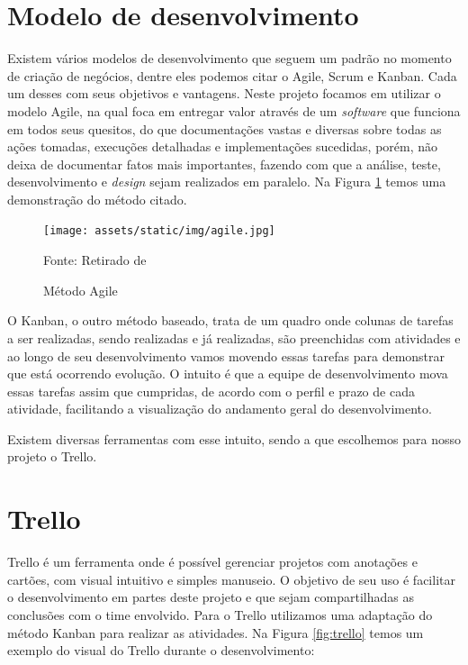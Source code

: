 \documentclass[../../layout.tex]{subfiles}
\begin{document}
\section{Modelo de desenvolvimento}
\hspace*{3em}Existem vários modelos de desenvolvimento que seguem um padrão no momento de criação de negócios, dentre eles podemos citar o Agile, Scrum e Kanban. Cada um desses com seus objetivos e vantagens. Neste projeto focamos em utilizar o modelo Agile, na qual foca em entregar valor através de um \emph{software} que funciona em todos seus quesitos, do que documentações vastas e diversas sobre todas as ações tomadas, execuções detalhadas e implementações sucedidas, porém, não deixa de documentar fatos mais importantes, fazendo com que a análise, teste, desenvolvimento e \emph{design} sejam realizados em paralelo. Na Figura \ref{fig:agile} temos uma demonstração do método citado.

\begin{figure}[H]
\centering
\caption{Método Agile}
\texttt{[image: assets/static/img/agile.jpg]}
\label{fig:agile}

\begin{minipage}{0.5\textwidth}
\raggedright \footnotesize Fonte: Retirado de 
\end{minipage}
\end{figure}

\hspace*{3em}O Kanban, o outro método baseado, trata de um quadro onde colunas de tarefas a ser realizadas, sendo realizadas e já realizadas, são preenchidas com atividades e ao longo de seu desenvolvimento vamos movendo essas tarefas para demonstrar que está ocorrendo evolução. O intuito é que a equipe de desenvolvimento mova essas tarefas assim que cumpridas, de acordo com o perfil e prazo de cada atividade, facilitando a visualização do andamento geral do desenvolvimento. \par
\hspace*{3em}Existem diversas ferramentas com esse intuito, sendo a que escolhemos para nosso projeto o Trello.

\section{Trello}
\hspace*{3em}Trello é um ferramenta onde é possível gerenciar projetos com anotações e cartões, com visual intuitivo e simples manuseio. O objetivo de seu uso é facilitar o desenvolvimento em partes deste projeto e que sejam compartilhadas as conclusões com o time envolvido. Para o Trello utilizamos uma adaptação do método Kanban para realizar as atividades.
\hspace*{3em}Na Figura \ref{fig:trello} temos um exemplo do visual do Trello durante o desenvolvimento:
\end{document}
